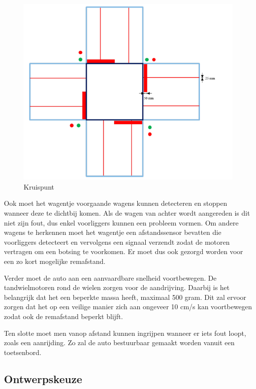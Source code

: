 \documentclass[a4paper,twoside,kulak]{kulakreport} %
\begin{document}
\begin{figure}
	\centering
	\includegraphics[width=.6\textwidth]{volglijnenEnStoplijnen}
	\caption{Kruispunt}
	\label{fig:plattegrond}
\end{figure}

Ook moet het wagentje voorgaande wagens kunnen detecteren en stoppen wanneer deze te dichtbij komen. Als de wagen van achter wordt aangereden is dit niet zijn fout, dus enkel voorliggers kunnen een probleem vormen. Om andere wagens te herkennen moet het wagentje een afstandssensor bevatten die voorliggers detecteert en vervolgens een signaal verzendt zodat de motoren vertragen om een botsing te voorkomen. Er moet dus ook gezorgd worden voor een zo kort mogelijke remafstand.

Verder moet de auto aan een aanvaardbare snelheid voortbewegen. De tandwielmotoren rond de wielen zorgen voor de aandrijving. Daarbij is het belangrijk dat het een beperkte massa heeft, maximaal 500 gram. Dit zal ervoor zorgen dat het op een veilige manier zich aan ongeveer 10 cm/s kan voortbewegen zodat ook de remafstand beperkt blijft.

Ten slotte moet men vanop afstand kunnen ingrijpen wanneer er iets fout loopt, zoals een aanrijding. Zo zal de auto bestuurbaar gemaakt worden vanuit een toetsenbord.






\subsection{Ontwerpskeuze}
\label{Ontwerpskeuze}
\end{document}
